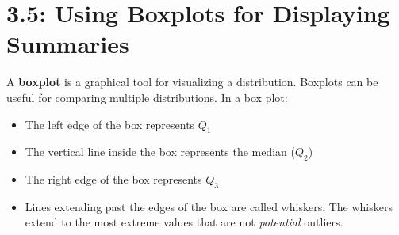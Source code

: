 \documentclass[../mathNotesPreamble]{subfiles}
\providecommand{\relscalefact}{1.4}
\begin{document}
\relscale{\relscalefact}
  \section{3.5: Using Boxplots for Displaying Summaries}

  \begin{defn*}
    A \textbf{boxplot} is a graphical tool for visualizing a distribution. Boxplots can be useful for comparing multiple distributions. In a box plot:
    \begin{itemize}
      \item The left edge of the box represents $Q_1$
      \item The vertical line inside the box represents the median ($Q_2$)
      \item The right edge of the box represents $Q_3$
      \item Lines extending past the edges of the box are called whiskers. The whiskers extend to the most extreme values that are not \emph{potential} outliers.
    \end{itemize}
  \end{defn*}
\end{document}
